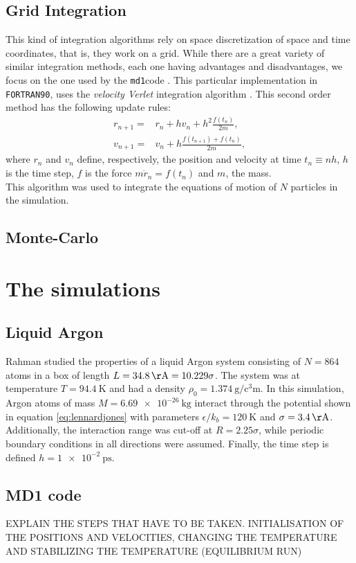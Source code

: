 \documentclass[%
aip,
jmp,%
amsmath,amssymb,
preprint,%
reprint,%
notitlepage,
a4paper]{revtex4-1}
\newcommand{\md}{\texttt{md1}}
\begin{document}
\subsection{Grid Integration}
This kind of integration algorithms rely on space discretization of space and time coordinates, that is, they work on a grid. While there are a great variety of similar integration methods, each one having advantages and disadvantages, we focus on the one used by the \md  code \cite{Ercolessi}. This particular implementation in \texttt{FORTRAN90}, uses the \textit{velocity Verlet} integration algorithm \cite{Swope1982}. This second order method has the following update rules:
\begin{align}
r_{n+1} =& r_n + h v_n + h^2\frac{f(t_n)}{2m},\\
v_{n+1} = & v_n + h\frac{f(t_{n+1} )+ f(t_n)}{2m},
\end{align}
where $r_n$ and $v_n$ define, respectively, the position and velocity at time $t_n\equiv nh$, $h$ is the time step, $f$ is the force $m\ddot{r}_n = f(t_n)$ and $m$, the mass.\\
This algorithm was used to integrate the equations of motion of $N$ particles in the simulation.
\subsection{Monte-Carlo}
\section{The simulations}
\subsection{Liquid Argon}
Rahman\cite{Rahman1964} studied the properties of a liquid Argon system consisting of $N=864$ atoms in a box of length $L = \SI{34.8}{\AA} = 10.229\sigma$. The system was at temperature $T = \SI{94.4}{\kelvin}$ and had a density $\rho_0 = \SI{1.374}{\gram\per\cubic\centi\meter}$. In this simulation, Argon atoms of mass $M = \SI{6.69e-26}{\kilogram}$ interact through the potential shown in equation \ref{eq:lennardjones} with parameters $\epsilon/k_b = \SI{120}{\kelvin}$ and $\sigma = \SI{3.4}{\AA}$. Additionally, the interaction range was cut-off at $R = 2.25\sigma$, while periodic boundary conditions in all directions were assumed. Finally, the time step is defined $h = \SI{1e-2}{\pico\second}$.
\subsection{MD1 code}
EXPLAIN THE STEPS THAT HAVE TO BE TAKEN. INITIALISATION OF THE POSITIONS AND VELOCITIES, CHANGING THE TEMPERATURE AND STABILIZING THE TEMPERATURE (EQUILIBRIUM RUN)
\end{document}
